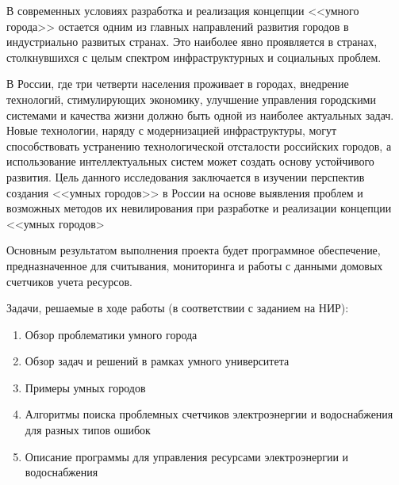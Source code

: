 
В современных условиях разработка и реализация концепции <<умного города>> остается одним из главных направлений развития городов в индустриально развитых странах. Это наиболее явно проявляется в странах, столкнувшихся с целым спектром инфраструктурных и социальных проблем.

В России, где три четверти населения проживает в городах, внедрение технологий, стимулирующих экономику, улучшение управления городскими системами и качества жизни должно быть одной из наиболее актуальных задач. Новые технологии, наряду с модернизацией инфраструктуры, могут способствовать устранению технологической отсталости российских городов, а использование интеллектуальных систем может создать основу устойчивого развития.\cite{Harrison}
Цель данного исследования заключается в изучении перспектив создания <<умных городов>> в России на основе выявления проблем и возможных методов их невилирования при разработке и реализации концепции <<умных городов>

Основным результатом выполнения проекта будет программное обеспечение, предназначенное для считывания, мониторинга и работы с данными домовых счетчиков учета ресурсов.

Задачи, решаемые в ходе работы (в соответствии с заданием на НИР):
 \begin{enumerate}
 	\item Обзор проблематики умного города
	\item Обзор задач и решений в рамках умного университета 
	\item Примеры умных городов
	\item Алгоритмы поиска проблемных счетчиков электроэнергии и водоснабжения для разных типов ошибок
	\item Описание программы для управления ресурсами электроэнергии и водоснабжения
\end{enumerate}
